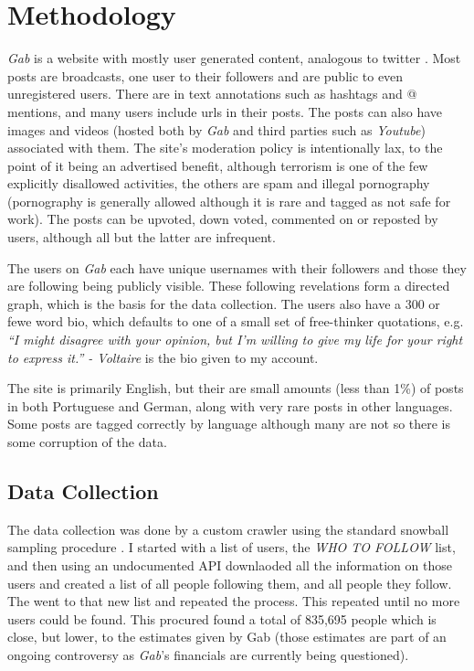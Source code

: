 \documentclass[letterpaper]{article}
\begin{document}
\section{Methodology}

\textit{Gab} is a website with mostly user generated content, analogous to twitter \cite{darroch2017}. Most posts are broadcasts, one user to their followers and are public to even unregistered users. There are in text annotations such as hashtags and @ mentions, and many users include urls in their posts. The posts can also have images and videos (hosted both by \textit{Gab} and third parties such as \textit{Youtube}) associated with them. The site's moderation policy is intentionally lax, to the point of it being an advertised benefit, although terrorism is one of the few explicitly disallowed activities, the others are spam and illegal pornography (pornography is generally allowed although it is rare and tagged as not safe for work). The posts can be upvoted, down voted, commented on or reposted by users, although all but the latter are infrequent. 

The users on \textit{Gab} each have unique usernames with their followers and those they are following being publicly visible. These following revelations form a directed graph, which is the basis for the data collection. The users also have a 300 or fewe word bio, which defaults to one of a small set of free-thinker quotations, e.g. \textit{``I might disagree with your opinion, but I'm willing to give my life for your right to express it.'' - Voltaire} is the bio given to my account.

The site is primarily English, but their are small amounts (less than 1\%) of posts in both Portuguese and German, along with very rare posts in other languages. Some posts are tagged correctly by language although many are not so there is some corruption of the data.

\subsection{Data Collection}

The data collection was done by a custom crawler using the standard snowball sampling procedure \cite{goodman1961snowball}. I started with a list of users, the \textit{WHO TO FOLLOW} list, and then using an undocumented API downlaoded all the information on those users and created a list of all people following them, and all people they follow. The went to that new list and repeated the process. This repeated until no more users could be found. This procured found a total of 835,695 people which is close, but lower, to the estimates given by Gab (those estimates are part of an ongoing controversy as \textit{Gab}'s financials are currently being questioned).
\end{document}
